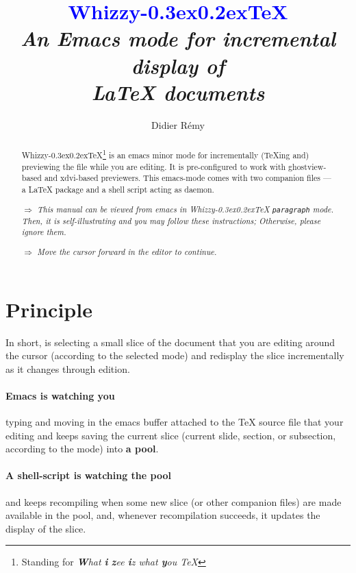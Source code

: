 \documentclass{article}
\def \whizzy{{Whizzy\kern -0.3ex\raise 0.2ex\hbox{\TeX}}}
\def \Whizzy{\textbf {\textcolor {blue}{\whizzy}}}
\def \instruction #1{\par\medskip \noindent$\Rightarrow$ {\em #1}}
\begin{document}
\pagestyle {empty}

\author {Didier R{\'e}my}

\title {
{\huge \Whizzy}
\\[1em]
{\em An {\bfseries Emacs mode} 
for incremental display of \\ 
{\bfseries {\LaTeX} documents}}
}

\maketitle   


\begin{abstract}
\def \B{\textbf}
{\whizzy}\footnote {Standing for {\em {\B W}hat {\B i} {\B z}ee
{\B i}z what {\B y}ou {\expandafter \B \TeX}}} is an emacs minor mode for
incrementally ({\TeX}ing and) previewing the file while you are editing.
%
It is pre-configured to work with ghostview-based and xdvi-based previewers.
This emacs-mode comes with two companion files ---a {\LaTeX} package and a
shell script acting as daemon. 

\instruction 
{This manual can be viewed from emacs in {\whizzy} {\tt paragraph}
mode. Then, it is self-illustrating and you may follow these instructions;
Otherwise, please ignore them.}

\instruction {Move the cursor forward in the editor to continue.}
\end{abstract}

\section {Principle} 

In short, {\sc \whizzy} is selecting a small slice of the document that 
you are editing around the cursor (according to the selected mode) 
and redisplay the slice incrementally as it changes through edition. 

\paragraph {Emacs is watching you} typing and moving in the 
emacs buffer attached to the {\TeX} source file that your editing and keeps
saving the current slice (current slide, section, or subsection, according
to the mode) into {\bf a pool}.

\paragraph {A shell-script is watching the pool}
and keeps recompiling when some new slice (or other companion files) 
are made available in the pool, and, whenever recompilation succeeds, it 
updates the display of the slice. 
\end{document}

